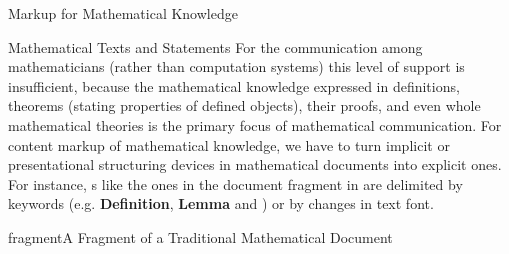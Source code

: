 \begin{tchapter}[id=math-markup]{Markup for Mathematical Knowledge}
\begin{tsection}[id=meta-math]{Mathematical Texts and Statements}
  For the communication among mathematicians (rather than computation systems) this level
  of support is insufficient, because the mathematical knowledge expressed in definitions,
  theorems (stating properties of defined objects), their proofs, and even whole
  mathematical theories is the primary focus of mathematical communication. For content
  markup of mathematical knowledge, we have to turn implicit or presentational structuring
  devices in mathematical documents into explicit ones. For
  instance, {s} like the ones in the document fragment in
  {} are delimited by keywords (e.g. {\bf{Definition}}, {\bf{Lemma}}
  and {\boexchen}) or by changes in text font.

\begin{myfig}{fragment}{A Fragment of a Traditional Mathematical Document}
\end{myfig}
\end{tsection}
\end{tchapter}
